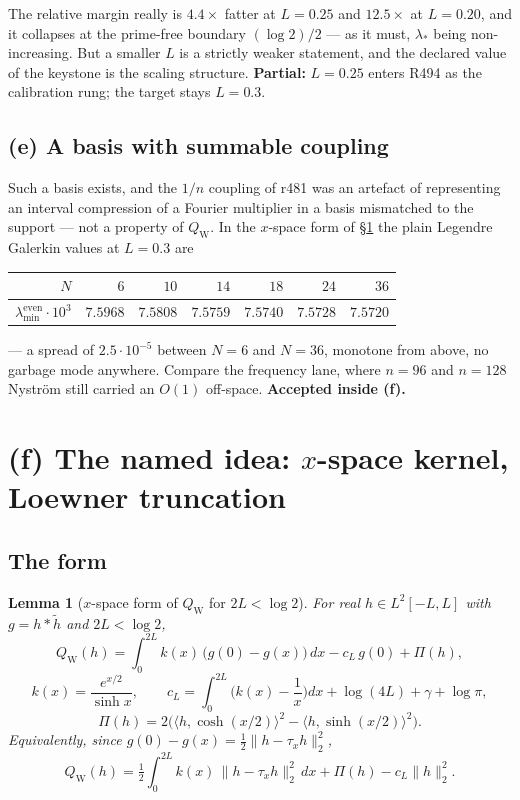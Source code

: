 \documentclass[11pt]{article}
\newtheorem{lemma}{Lemma}
\theoremstyle{remark}
\newcommand{\QW}{Q_{\mathrm W}}
\begin{document}
The relative margin really is $4.4\times$ fatter at $L=0.25$
and $12.5\times$ at $L=0.20$, and it collapses at the
prime-free boundary $(\log2)/2$ --- as it must, $\lambda_*$
being non-increasing.
But a smaller $L$ is a strictly weaker statement, and the
declared value of the keystone is the scaling structure.
\textbf{Partial:} $L=0.25$ enters R494 as the calibration rung;
the target stays $L=0.3$.

\subsection{(e) A basis with summable coupling}\label{sec:e}

Such a basis exists, and the $1/n$ coupling of r481 was an
artefact of representing an interval compression of a Fourier
multiplier in a basis mismatched to the support --- not a
property of $\QW$.  In the $x$-space form of \S\ref{sec:f} the
plain Legendre Galerkin values at $L=0.3$ are

\begin{center}
\small
\begin{tabular}{@{}rrrrrrr@{}}
\toprule
$N$ & $6$ & $10$ & $14$ & $18$ & $24$ & $36$ \\
\midrule
$\lambda_{\min}^{\mathrm{even}}\cdot10^{3}$
 & $7.5968$ & $7.5808$ & $7.5759$ & $7.5740$ & $7.5728$ & $7.5720$ \\
\bottomrule
\end{tabular}
\end{center}

--- a spread of $2.5\cdot10^{-5}$ between $N=6$ and $N=36$,
monotone from above, no garbage mode anywhere.
Compare the frequency lane, where $n=96$ and $n=128$ Nystr\"om
still carried an $O(1)$ off-space.
\textbf{Accepted inside (f).}

\section{(f) The named idea: $x$-space kernel, Loewner
truncation}\label{sec:f}

\subsection{The form}

\begin{lemma}[$x$-space form of $\QW$ for $2L<\log2$]
\label{lem:xform}
For real $h\in L^2[-L,L]$ with $g=h*\widetilde h$ and
$2L<\log2$,
\[
  \QW(h)=\int_0^{2L}k(x)\,\big(g(0)-g(x)\big)\,dx
        -c_L\,g(0)+\Pi(h),
\]
\[
  k(x)=\frac{e^{x/2}}{\sinh x},\qquad
  c_L=\int_0^{2L}\Big(k(x)-\frac1x\Big)dx+\log(4L)+\gamma+\log\pi,
\]
\[
  \Pi(h)=2\Big(\langle h,\cosh(x/2)\rangle^2
              -\langle h,\sinh(x/2)\rangle^2\Big).
\]
Equivalently, since $g(0)-g(x)=\tfrac12\|h-\tau_xh\|_2^2$,
\[
  \QW(h)=\tfrac12\int_0^{2L}k(x)\,\|h-\tau_xh\|_2^2\,dx
        +\Pi(h)-c_L\|h\|_2^2 .
\]
\end{lemma}
\end{document}
